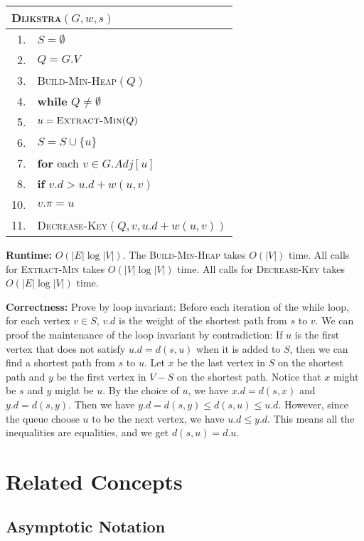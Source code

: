 \documentclass[a4paper,12pt]{article}
\begin{document}
\begin{center}
	\begin{tabular}{rl}
		\toprule
		\multicolumn{2}{l}{\textsc{Dijkstra}$(G, w, s)$} \\
		\midrule
		1. & $S = \emptyset$ \\
		2. & $Q = G.V$ \\
		3. & \textsc{Build-Min-Heap}$(Q)$ \\
		4. & \textbf{while} $Q \neq \emptyset$ \\
		5. & \quad $u = \textsc{Extract-Min}(Q)$ \\
		6. & \quad $S = S \cup \{u\}$ \\
		7. & \quad \textbf{for} each $v \in G.Adj[u]$ \\
		8. & \quad \quad \textbf{if} $v.d > u.d + w(u, v)$ \\
		10. & \quad \quad \quad $v.\pi = u$ \\
		11. & \quad \quad \quad \textsc{Decrease-Key}$(Q, v, u.d + w(u, v))$ \\
		\bottomrule
	\end{tabular}
\end{center}

\textbf{Runtime:}
$O(|E| \log |V|)$.
The \textsc{Build-Min-Heap} takes $O(|V|)$ time.
All calls for \textsc{Extract-Min} takes $O(|V| \log |V|)$ time.
All calls for \textsc{Decrease-Key} takes $O(|E| \log |V|)$ time.

\textbf{Correctness:}
Prove by loop invariant:
Before each iteration of the while loop, for each vertex $v \in S$, $v.d$ is the weight of the shortest path from $s$ to $v$.
We can proof the maintenance of the loop invariant by contradiction:
If $u$ is the first vertex that does not satisfy $u.d = d(s, u)$ when it is added to $S$, then we can find a shortest path from $s$ to $u$.
Let $x$ be the last vertex in $S$ on the shortest path and $y$ be the first vertex in $V - S$ on the shortest path.
Notice that $x$ might be $s$ and $y$ might be $u$.
By the choice of $u$, we have $x.d = d(s, x)$ and $y.d = d(s, y)$.
Then we have $y.d = d(s, y) \leq d(s, u) \leq u.d$.
However, since the queue choose $u$ to be the next vertex, we have $u.d \leq y.d$.
This means all the inequalities are equalities, and we get $d(s,u) = d.u$.

\section{Related Concepts}

\subsection{Asymptotic Notation}
\end{document}
